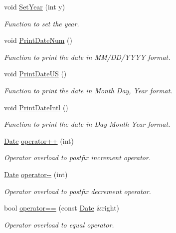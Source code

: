 \begin{DoxyCompactItemize}
void \mbox{\hyperlink{class_date_ae77d46d475c904d1fabcb91933034514}{Set\+Year}} (int y)
\begin{DoxyCompactList}\small\item\em Function to set the year. \end{DoxyCompactList}\item 
void \mbox{\hyperlink{class_date_a885f573b35217aef6e4f35a8ac203c35}{Print\+Date\+Num}} ()
\begin{DoxyCompactList}\small\item\em Function to print the date in M\+M/\+D\+D/\+Y\+Y\+YY format. \end{DoxyCompactList}\item 
void \mbox{\hyperlink{class_date_a303bf76ec61948983685b333392a9559}{Print\+Date\+US}} ()
\begin{DoxyCompactList}\small\item\em Function to print the date in Month Day, Year format. \end{DoxyCompactList}\item 
void \mbox{\hyperlink{class_date_afcaa5f92016d63644845ce1d934a339a}{Print\+Date\+Intl}} ()
\begin{DoxyCompactList}\small\item\em Function to print the date in Day Month Year format. \end{DoxyCompactList}\item 
\mbox{\hyperlink{class_date}{Date}} \mbox{\hyperlink{class_date_a63f7060a7a7997e289e5e885f84557e5}{operator++}} (int)
\begin{DoxyCompactList}\small\item\em Operator overload to postfix increment operator. \end{DoxyCompactList}\item 
\mbox{\hyperlink{class_date}{Date}} \mbox{\hyperlink{class_date_ac2237a5f9f832bb521fe8f299a47db95}{operator-\/-\/}} (int)
\begin{DoxyCompactList}\small\item\em Operator overload to postfix decrement operator. \end{DoxyCompactList}\item 
bool \mbox{\hyperlink{class_date_ab672204162beca5eca19c967cac9cd18}{operator==}} (const \mbox{\hyperlink{class_date}{Date}} \&right)
\begin{DoxyCompactList}\small\item\em Operator overload to equal operator. \end{DoxyCompactList}\item 

\end{DoxyCompactItemize}
